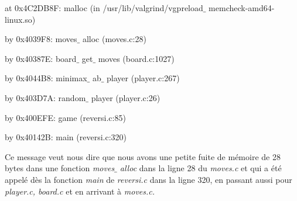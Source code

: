 \documentclass[a4paper,12pt]{article}
\begin{document}
\noindent \begin{justify}
\hspace*{0.49in}\hspace*{0.49in}at 0x4C2DB8F: malloc (in /usr/lib/valgrind/vgpreload$ \_ $ memcheck-amd64-linux.so)
\end{justify}\par


\noindent \begin{justify}
\hspace*{0.49in}\hspace*{0.49in}by 0x4039F8: moves$ \_ $ alloc (moves.c:28)
\end{justify}\par


\noindent \begin{justify}
\hspace*{0.49in}\hspace*{0.49in}by 0x40387E: board$ \_ $ get$ \_ $ moves (board.c:1027)
\end{justify}\par


\noindent \begin{justify}
\hspace*{0.49in}\hspace*{0.49in}by 0x4044B8: minimax$ \_ $ ab$ \_ $ player (player.c:267)
\end{justify}\par


\noindent \begin{justify}
\hspace*{0.49in}\hspace*{0.49in}by 0x403D7A: random$ \_ $ player (player.c:26)
\end{justify}\par


\noindent \begin{justify}
\hspace*{0.49in}\hspace*{0.49in}by 0x400EFE: game (reversi.c:85)
\end{justify}\par


\noindent \begin{justify}
\hspace*{0.49in}\hspace*{0.49in}by 0x40142B: main (reversi.c:320)
\end{justify}\par

\vspace{\baselineskip}
\noindent \begin{justify}
Ce message veut nous dire que nous avons une petite fuite de mémoire de 28 bytes dans une fonction \textit{moves$ \_ $ alloc} dans la ligne 28 du \textit{moves.c} et qui a été appelé dès la fonction \textit{main} de \textit{reversi.c }dans la ligne 320, en passant aussi pour \textit{player.c, board.c }et en arrivant à \textit{moves.c.}
\end{justify}\par
\end{document}
